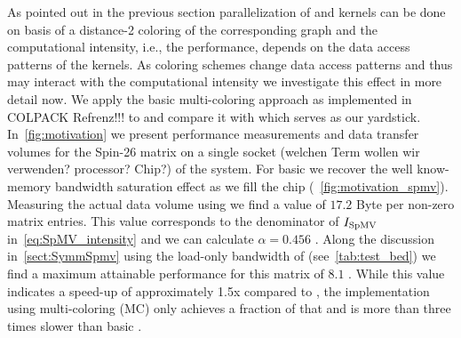 
As pointed out in the previous section parallelization of \SymmSpmv and \KACZ kernels can be done on basis of a distance-2 coloring of the corresponding graph and the computational intensity, i.e., the performance, depends on the data access patterns of the kernels. As coloring schemes change data access patterns and thus may interact with the computational intensity we investigate this effect in more detail now. We apply  the basic multi-coloring approach as implemented in COLPACK {\GW Refrenz!!!} to \SymmSpmv and compare it with \SpMV which serves as our yardstick. In~\cref{fig:motivation} we present performance measurements and data transfer volumes for the Spin-26 matrix on a single socket ({\GW welchen Term wollen wir verwenden? processor? Chip?}) of the \IVB system. For basic \SpMV we recover the well know-memory bandwidth saturation effect as we fill the chip (~\cref{fig:motivation_spmv}). Measuring the actual data volume using \LIKWID we find a value of $17.2$ Byte per non-zero matrix entries. This value corresponds to the denominator of $I_\mathrm{SpMV}$ in~\cref{eq:SpMV_intensity} and we can calculate $\alpha=0.456$ . Along the discussion in~\cref{sect:SymmSpmv} using the load-only bandwidth of \IVB (see~\cref{tab:test_bed}) we find a maximum attainable performance for this matrix of $8.1$ \GF. While this value indicates a speed-up of approximately 1.5x compared to \SpMV, the \SymmSpmv implementation using multi-coloring (MC) only achieves a fraction of that and is more than three times slower than basic \SpMV. 



